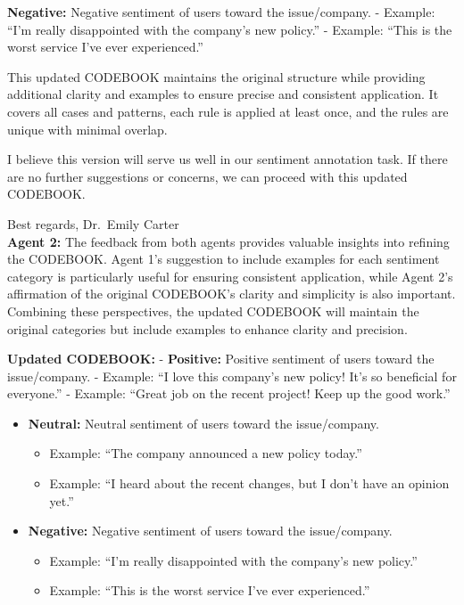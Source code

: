 \textbf{Negative:} Negative sentiment of users toward the issue/company.
- Example: ``I'm really disappointed with the company's new policy.'' -
Example: ``This is the worst service I've ever experienced.''

This updated CODEBOOK maintains the original structure while providing
additional clarity and examples to ensure precise and consistent
application. It covers all cases and patterns, each rule is applied at
least once, and the rules are unique with minimal overlap.

I believe this version will serve us well in our sentiment annotation
task. If there are no further suggestions or concerns, we can proceed
with this updated CODEBOOK.

Best regards, Dr.~Emily Carter\\

\textbf{Agent 2:} The feedback from both agents provides valuable insights into
refining the CODEBOOK. Agent 1's suggestion to include examples for each
sentiment category is particularly useful for ensuring consistent
application, while Agent 2's affirmation of the original CODEBOOK's
clarity and simplicity is also important. Combining these perspectives,
the updated CODEBOOK will maintain the original categories but include
examples to enhance clarity and precision.

\textbf{Updated CODEBOOK:} - \textbf{Positive:} Positive sentiment of
users toward the issue/company. - Example: ``I love this company's new
policy! It's so beneficial for everyone.'' - Example: ``Great job on the
recent project! Keep up the good work.''

\begin{itemize}
\tightlist
\item
  \textbf{Neutral:} Neutral sentiment of users toward the issue/company.

  \begin{itemize}
  \tightlist
  \item
    Example: ``The company announced a new policy today.''
  \item
    Example: ``I heard about the recent changes, but I don't have an
    opinion yet.''
  \end{itemize}
\item
  \textbf{Negative:} Negative sentiment of users toward the
  issue/company.

  \begin{itemize}
  \tightlist
  \item
    Example: ``I'm really disappointed with the company's new policy.''
  \item
    Example: ``This is the worst service I've ever experienced.''
  \end{itemize}
\end{itemize}

